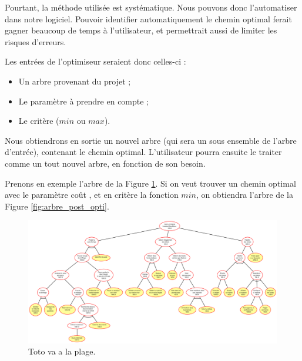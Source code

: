 		Pourtant, la méthode utilisée est systématique. Nous pouvons donc l'automatiser dans notre logiciel. Pouvoir identifier automatiquement le chemin optimal ferait gagner beaucoup de temps à l'utilisateur, et permettrait aussi de limiter les risques d'erreurs.

		Les entrées de l'optimiseur seraient donc celles-ci :
		\begin{itemize}
			\item Un arbre provenant du projet ;
			\item Le paramètre à prendre en compte ;
			\item Le critère ($min$ ou $max$).
		\end{itemize}

		Nous obtiendrons en sortie un nouvel arbre (qui sera un sous ensemble de l'arbre d'entrée), contenant le chemin optimal. 
		L'utilisateur pourra ensuite le traiter comme un tout nouvel arbre, en fonction de son besoin.
		
		Prenons en exemple l'arbre de la {\sc Figure} \ref{fig:pre_optimiseur}. Si on veut trouver un chemin optimal avec le paramètre \og coût \fg, et en critère la fonction $min$, on obtiendra l'arbre de la {\sc Figure} \ref{fig:arbre_post_opti}.
		
	\begin{landscape}
        \begin{figure}
            \includegraphics[height=0.82\textwidth]{figure/pre_optimiseur.pdf}
            \caption{Toto va a la plage.}
            \label{fig:pre_optimiseur}
        \end{figure}
    	\end{landscape}		
		
